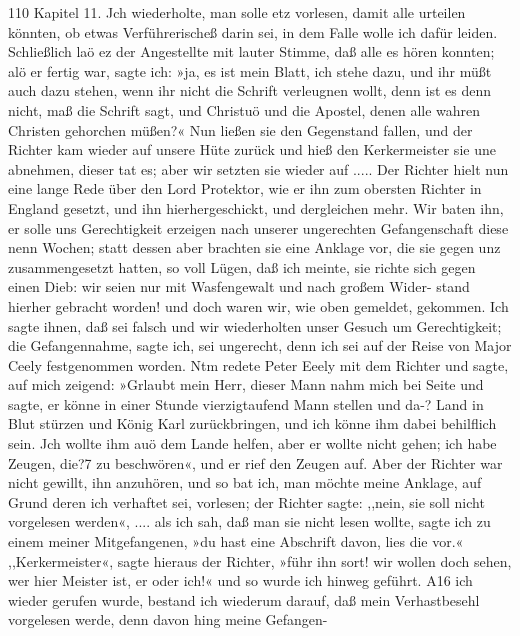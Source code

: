 110 Kapitel 11.
Jch wiederholte, man solle etz vorlesen, damit alle urteilen könnten,
ob etwas Verführerischeß darin sei, in dem Falle wolle ich dafür
leiden. Schließlich laö ez der Angestellte mit lauter Stimme, daß
alle es hören konnten; alö er fertig war, sagte ich: »ja, es ist
mein Blatt, ich stehe dazu, und ihr müßt auch dazu stehen, wenn
ihr nicht die Schrift verleugnen wollt, denn ist es denn nicht, maß
die Schrift sagt, und Christuö und die Apostel, denen alle wahren
Christen gehorchen müßen?« Nun ließen sie den Gegenstand
fallen, und der Richter kam wieder auf unsere Hüte zurück und
hieß den Kerkermeister sie une abnehmen, dieser tat es; aber wir
setzten sie wieder auf ..... Der Richter hielt nun eine lange
Rede über den Lord Protektor, wie er ihn zum obersten Richter
in England gesetzt, und ihn hierhergeschickt, und dergleichen mehr.
Wir baten ihn, er solle uns Gerechtigkeit erzeigen nach unserer
ungerechten Gefangenschaft diese nenn Wochen; statt dessen aber
brachten sie eine Anklage vor, die sie gegen unz zusammengesetzt
hatten, so voll Lügen, daß ich meinte, sie richte sich gegen einen
Dieb: wir seien nur mit Wasfengewalt und nach großem Wider-
stand hierher gebracht worden! und doch waren wir, wie oben
gemeldet, gekommen. Ich sagte ihnen, daß sei falsch und wir
wiederholten unser Gesuch um Gerechtigkeit; die Gefangennahme,
sagte ich, sei ungerecht, denn ich sei auf der Reise von Major
Ceely festgenommen worden. Ntm redete Peter Eeely mit dem
Richter und sagte, auf mich zeigend: »Grlaubt mein Herr, dieser
Mann nahm mich bei Seite und sagte, er könne in einer Stunde
vierzigtaufend Mann stellen und da-? Land in Blut stürzen und
König Karl zurückbringen, und ich könne ihm dabei behilflich sein.
Jch wollte ihm auö dem Lande helfen, aber er wollte nicht
gehen; ich habe Zeugen, die?7 zu beschwören«, und er rief den
Zeugen auf. Aber der Richter war nicht gewillt, ihn anzuhören,
und so bat ich, man möchte meine Anklage, auf Grund deren
ich verhaftet sei, vorlesen; der Richter sagte: ,,nein, sie soll nicht
vorgelesen werden«, .... als ich sah, daß man sie nicht lesen
wollte, sagte ich zu einem meiner Mitgefangenen, »du hast eine
Abschrift davon, lies die vor.« ,,Kerkermeister«, sagte hieraus der
Richter, »führ ihn sort! wir wollen doch sehen, wer hier Meister
ist, er oder ich!« und so wurde ich hinweg geführt. A16 ich
wieder gerufen wurde, bestand ich wiederum darauf, daß mein
Verhastbesehl vorgelesen werde, denn davon hing meine Gefangen-



